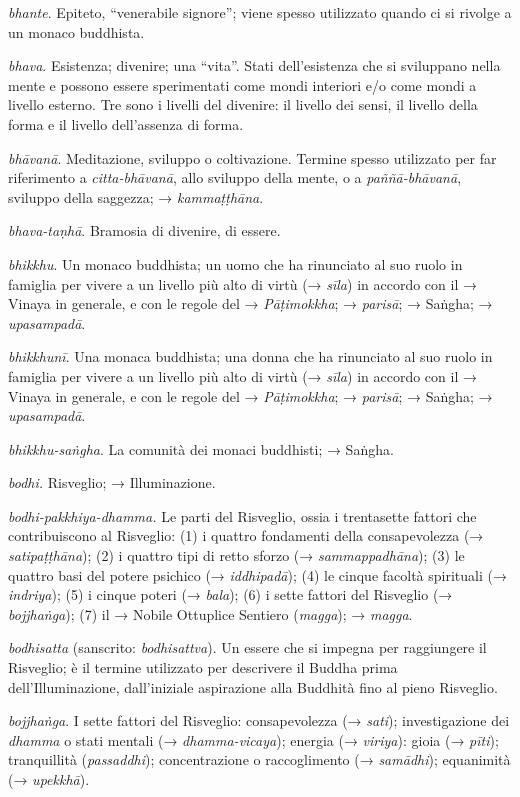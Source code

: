 \emph{bhante}. Epiteto, ``venerabile signore''; viene spesso utilizzato
quando ci si rivolge a un monaco buddhista.

\emph{bhava}. Esistenza; divenire; una ``vita''. Stati dell'esistenza
che si sviluppano nella mente e possono essere sperimentati come mondi
interiori e/o come mondi a livello esterno. Tre sono i livelli del
divenire: il livello dei sensi, il livello della forma e il livello
dell'assenza di forma.

\emph{bhāvanā}. Meditazione, sviluppo o coltivazione. Termine spesso
utilizzato per far riferimento a \emph{citta-bhāvanā}, allo sviluppo
della mente, o a \emph{paññā-bhāvanā}, sviluppo della saggezza; →
\emph{kammaṭṭhāna}.

\emph{bhava-taṇhā}. Bramosia di divenire, di essere.

\emph{bhikkhu}. Un monaco buddhista; un uomo che ha rinunciato al suo
ruolo in famiglia per vivere a un livello più alto di virtù (→
\emph{sīla}) in accordo con il → Vinaya in generale, e con le regole del
→ \emph{Pāṭimokkha}; → \emph{parisā}; → Saṅgha; → \emph{upasampadā}.

\emph{bhikkhunī}. Una monaca buddhista; una donna che ha rinunciato al
suo ruolo in famiglia per vivere a un livello più alto di virtù (→
\emph{sīla}) in accordo con il → Vinaya in generale, e con le regole del
→ \emph{Pāṭimokkha}; → \emph{parisā}; → Saṅgha; → \emph{upasampadā}.

\emph{bhikkhu-saṅgha}. La comunità dei monaci buddhisti; → Saṅgha.

\emph{bodhi.} Risveglio; → Illuminazione.

\emph{bodhi-pakkhiya-dhamma.} Le parti del Risveglio, ossia i
trentasette fattori che contribuiscono al Risveglio: (1) i quattro
fondamenti della consapevolezza (→ \emph{satipaṭṭhāna}); (2) i quattro
tipi di retto sforzo (→ \emph{sammappadhāna}); (3) le quattro basi del
potere psichico (→ \emph{iddhipadā}); (4) le cinque facoltà spirituali
(→ \emph{indriya}); (5) i cinque poteri (→ \emph{bala}); (6) i sette
fattori del Risveglio (→ \emph{bojjhaṅga}); (7) il → Nobile Ottuplice
Sentiero (\emph{magga}); → \emph{magga}.

\emph{bodhisatta} (sanscrito: \emph{bodhisattva}). Un essere che si
impegna per raggiungere il Risveglio; è il termine utilizzato per
descrivere il Buddha prima dell'Illuminazione, dall'iniziale aspirazione
alla Buddhità fino al pieno Risveglio.

\emph{bojjhaṅga}. I sette fattori del Risveglio: consapevolezza (→
\emph{sati}); investigazione dei \emph{dhamma} o stati mentali (→
\emph{dhamma-vicaya}); energia (→ \emph{viriya}): gioia (→ \emph{pīti});
tranquillità (\emph{passaddhi}); concentrazione o raccoglimento (→
\emph{samādhi}); equanimità (→ \emph{upekkhā}).

